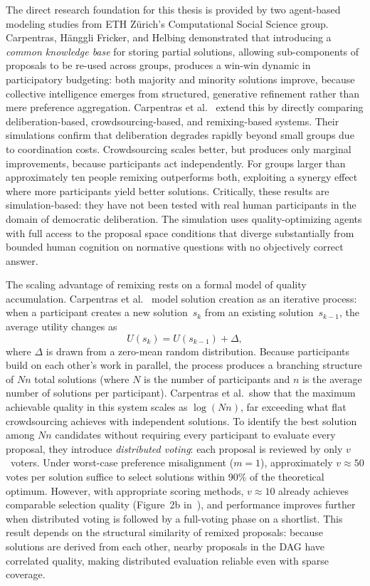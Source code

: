 \documentclass[a4paper, 12pt, twoside]{iviathesis}
\begin{document}
The direct research foundation for this thesis is provided by two agent-based modeling studies from ETH Z\"{u}rich's Computational Social Science group. Carpentras, H\"{a}nggli Fricker, and Helbing \cite{carpentras_empowering_2024} demonstrated that introducing a \textit{common knowledge base} for storing partial solutions, allowing sub-components of proposals to be re-used across groups, produces a win-win dynamic in participatory budgeting: both majority and minority solutions improve, because collective intelligence emerges from structured, generative refinement rather than mere preference aggregation. Carpentras et al.\ \cite{carpentras_wisdom_2025} extend this by directly comparing deliberation-based, crowdsourcing-based, and remixing-based systems. Their simulations confirm that deliberation degrades rapidly beyond small groups due to coordination costs. Crowdsourcing scales better, but produces only marginal improvements, because participants act independently. For groups larger than approximately ten people remixing outperforms both, exploiting a synergy effect where more participants yield better solutions. Critically, these results are simulation-based: they have not been tested with real human participants in the domain of democratic deliberation. The simulation uses quality-optimizing agents with full access to the proposal space conditions that diverge substantially from bounded human cognition on normative questions with no objectively correct answer.

The scaling advantage of remixing rests on a formal model of quality accumulation. Carpentras et al.~\cite{carpentras_wisdom_2025} model solution creation as an iterative process: when a participant creates a new solution~$s_k$ from an existing solution~$s_{k-1}$, the average utility changes as
\begin{equation}
  U(s_k) = U(s_{k-1}) + \Delta, \label{eq:quality-step}
\end{equation}
where $\Delta$ is drawn from a zero-mean random distribution. Because participants build on each other's work in parallel, the process produces a branching structure of $Nn$ total solutions (where $N$ is the number of participants and $n$ is the average number of solutions per participant). Carpentras et al.\ show that the maximum achievable quality in this system scales as $\log(Nn)$, far exceeding what flat crowdsourcing achieves with independent solutions. To identify the best solution among $Nn$ candidates without requiring every participant to evaluate every proposal, they introduce \textit{distributed voting}: each proposal is reviewed by only $v$~voters. Under worst-case preference misalignment ($m = 1$), approximately $v \approx 50$ votes per solution suffice to select solutions within 90\% of the theoretical optimum. However, with appropriate scoring methods, $v \approx 10$ already achieves comparable selection quality (Figure~2b in~\cite{carpentras_wisdom_2025}), and performance improves further when distributed voting is followed by a full-voting phase on a shortlist. This result depends on the structural similarity of remixed proposals: because solutions are derived from each other, nearby proposals in the DAG have correlated quality, making distributed evaluation reliable even with sparse coverage.
\end{document}
